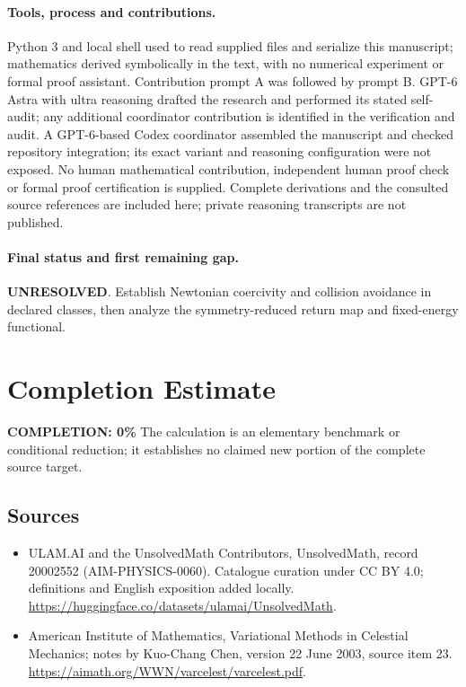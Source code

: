 \documentclass[11pt]{article}
\begin{document}
\paragraph{Tools, process and contributions.}
Python 3 and local shell used to read supplied files and serialize this manuscript; mathematics derived symbolically in the text, with no numerical experiment or formal proof assistant. Contribution prompt A was followed by prompt B. GPT-6 Astra with ultra reasoning drafted the research and performed its stated self-audit; any additional coordinator contribution is identified in the verification and audit. A GPT-6-based Codex coordinator assembled the manuscript and checked repository integration; its exact variant and reasoning configuration were not exposed. No human mathematical contribution, independent human proof check or formal proof certification is supplied. Complete derivations and the consulted source references are included here; private reasoning transcripts are not published.

\paragraph{Final status and first remaining gap.}
\textbf{UNRESOLVED}. Establish Newtonian coercivity and collision avoidance in declared classes, then analyze the symmetry-reduced return map and fixed-energy functional.

\section{Completion Estimate}
\noindent\textbf{COMPLETION: 0\%}
The calculation is an elementary benchmark or conditional reduction; it establishes no claimed new portion of the complete source target.

\subsection{Sources}
\begin{itemize}
\item[\hypertarget{source:20002552:1}{S1}] ULAM.AI and the UnsolvedMath Contributors, UnsolvedMath, record 20002552 (AIM-PHYSICS-0060). Catalogue curation under CC BY 4.0; definitions and English exposition added locally.
\url{https://huggingface.co/datasets/ulamai/UnsolvedMath}.
\item[\hypertarget{source:20002552:2}{S2}] American Institute of Mathematics, Variational Methods in Celestial Mechanics; notes by Kuo-Chang Chen, version 22 June 2003, source item 23.
\url{https://aimath.org/WWN/varcelest/varcelest.pdf}.
\end{itemize}
\label{end:20002552}
\end{document}
